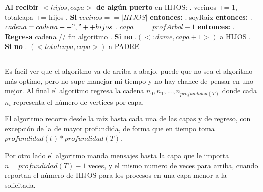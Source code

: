 \documentclass[8pt, letterpaper]{article}
\begin{document}
\begin{enumerate}
  \hspace{0.2cm} {\bf Al recibir $< hijos, capa >$ de algún puerto}
  en HIJOS:
  \hfill{}. vecinos += 1, totalcapa += hijos
  \hfill{}. {\bf Si} $vecinos ==  |HIJOS|$ {\bf entonces:}
  \hfill{}.\hspace{0.5cm}{\bf Si} soyRaiz {\bf entonces:}
  \hfill{}. \hspace{1cm}$cadena = cadena ++ ", "++ hijos$
  \hfill{}. \hspace{1cm}{\bf Si} $capa == profArbol-1$ {\bf entonces:}
  \hfill{}.\hspace{1.5cm} {\bf Regresa} cadena // fin algoritmo
  \hfill{}.\hspace{1cm} {\bf Si no}
  \hfill{}.\hspace{1.5cm}{\bf send}$(< :dame, capa+1>)$ a HIJOS
  \hfill{}.\hspace{0.5cm} {\bf Si no}
  \hfill{}. \hspace{1cm}{\bf send}$(< totalcapa, capa>)$ a PADRE
  \hfill\break
  \rule{1\textwidth}{0.2mm}
  \hfill\break
  \hfill\break

  Es facíl ver que el algoritmo va de arriba a abajo, puede que no sea el
  algoritmo más optimo, pero no supe manejar mi tiempo y no hay chance
  de pensar en uno mejor. Al final el algoritmo regresa la cadena $n_0, n_1,
  ..., n_{profundidad(T)}$ donde cada $n_i$ representa el número de vertices por
  capa.

    El algoritmo recorre desde la raíz hasta cada una de las capas y de regreso,
  con excepción de la de mayor profundida, de forma que en tiempo toma
  $profundidad(t)*profundidad(T)$.

  Por otro lado el algoritmo manda mensajes hasta la capa que le importa $n=
  profundidad(T)-1$ veces, y el mismo numero de veces para arriba, cuando
  reportan el número de HIJOS para los procesos en una capa menor a la
  solicitada.
\end{enumerate}
\end{document}
